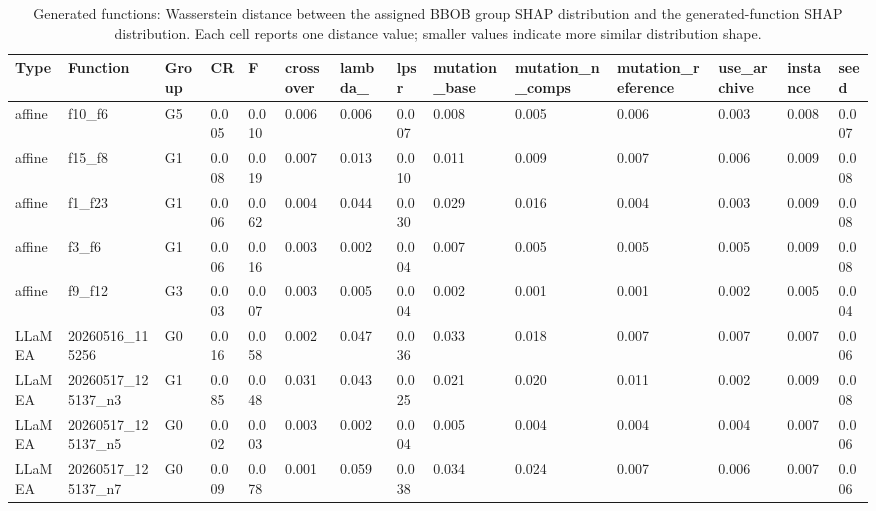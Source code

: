 \begin{table}[htbp]
\centering
\scriptsize
\setlength{\tabcolsep}{1.5pt}
\renewcommand{\arraystretch}{0.88}
\caption{Generated functions: Wasserstein distance between the assigned BBOB group SHAP distribution and the generated-function SHAP distribution. Each cell reports one distance value; smaller values indicate more similar distribution shape.}
\label{tab:generated-shap-shape-wasserstein-0307}
\begin{adjustbox}{width=\textwidth,center}
\begin{tabular}{llllllllllllll}
\toprule
Type & Function & Group & CR & F & crossover & lambda\_ & lpsr & mutation\_base & mutation\_n\_comps & mutation\_reference & use\_archive & instance & seed \\
\midrule
affine & f10\_f6 & G5 & 0.005 & 0.010 & 0.006 & 0.006 & 0.007 & 0.008 & 0.005 & 0.006 & 0.003 & 0.008 & 0.007 \\
affine & f15\_f8 & G1 & 0.008 & 0.019 & 0.007 & 0.013 & 0.010 & 0.011 & 0.009 & 0.007 & 0.006 & 0.009 & 0.008 \\
affine & f1\_f23 & G1 & 0.006 & 0.062 & 0.004 & 0.044 & 0.030 & 0.029 & 0.016 & 0.004 & 0.003 & 0.009 & 0.008 \\
affine & f3\_f6 & G1 & 0.006 & 0.016 & 0.003 & 0.002 & 0.004 & 0.007 & 0.005 & 0.005 & 0.005 & 0.009 & 0.008 \\
affine & f9\_f12 & G3 & 0.003 & 0.007 & 0.003 & 0.005 & 0.004 & 0.002 & 0.001 & 0.001 & 0.002 & 0.005 & 0.004 \\
LLaMEA & 20260516\_115256 & G0 & 0.016 & 0.058 & 0.002 & 0.047 & 0.036 & 0.033 & 0.018 & 0.007 & 0.007 & 0.007 & 0.006 \\
LLaMEA & 20260517\_125137\_n3 & G1 & 0.085 & 0.048 & 0.031 & 0.043 & 0.025 & 0.021 & 0.020 & 0.011 & 0.002 & 0.009 & 0.008 \\
LLaMEA & 20260517\_125137\_n5 & G0 & 0.002 & 0.003 & 0.003 & 0.002 & 0.004 & 0.005 & 0.004 & 0.004 & 0.004 & 0.007 & 0.006 \\
LLaMEA & 20260517\_125137\_n7 & G0 & 0.009 & 0.078 & 0.001 & 0.059 & 0.038 & 0.034 & 0.024 & 0.007 & 0.006 & 0.007 & 0.006 \\
\bottomrule
\end{tabular}
\end{adjustbox}
\end{table}